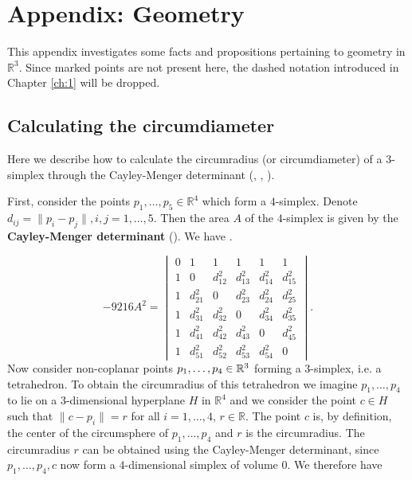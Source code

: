 \appendix

\chapter{Appendix: Geometry}\label{appendix}
This appendix investigates some facts and propositions pertaining to geometry in $\mathbb R^3$. Since marked points are not present here, the dashed notation introduced in Chapter \ref{ch:1} will be dropped.




\section{Calculating the circumdiameter}\label{A:CM}
Here we describe how to calculate the circumradius (or circumdiameter) of a $3$-simplex through the Cayley-Menger determinant (\cite{Cayley1841}, \cite{Menger28}, \cite{Uspensky48}). 

First, consider the points $p_1,\dots, p_5 \in \mathbb R^4$ which form a $4$-simplex. Denote $d_{ij} = \|p_i - p_j\|, i,j=1,\dots,5$. Then the area $A$ of the $4$-simplex is given by the \textbf{Cayley-Menger determinant} (\cite{Sommerville1929}). We have
. 

$$
-9216 A^2 =
\begin{vmatrix}
0 & 1 & 1 & 1 & 1 & 1 \\
1 & 0 & d^2_{12} & d^2_{13} & d^2_{14} & d^2_{15} \\
1 & d^2_{21} & 0 & d^2_{23} & d^2_{24} & d^2_{25}  \\
1 & d^2_{31} & d^2_{32} & 0 & d^2_{34} & d^2_{35} \\ 
1 & d^2_{41} & d^2_{42} & d^2_{43} & 0 & d^2_{45} \\
1 & d^2_{51} & d^2_{52} & d^2_{53} & d^2_{54} & 0 
\end{vmatrix}. 
$$
Now consider non-coplanar points $p_1,\dots, p_4 \in {\mathbb R^3}$ forming a $3$-simplex, i.e. a tetrahedron. To obtain the circumradius of this tetrahedron we imagine $p_1,\dots, p_4$ to lie on a $3$-dimensional hyperplane $H$ in $\mathbb R^4$ and we consider the point $c \in H$ such that $\|c-p_i\| = r$ for all $i=1,\dots,4$, $r\in \mathbb R$. The point $c$ is, by definition, the center of the circumsphere of $p_1,\dots,p_4$ and $r$ is the circumradius. The circumradius $r$ can be obtained using the Cayley-Menger determinant, since $p_1,\dots,p_4,c$ now form a $4$-dimensional simplex of volume $0$. We therefore have 


